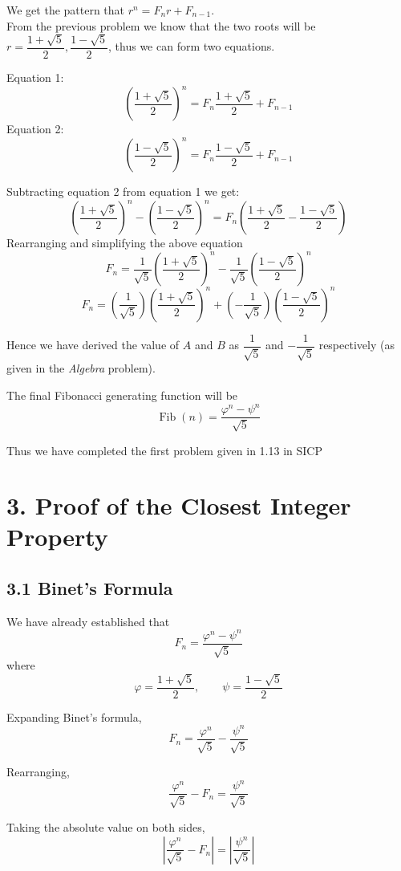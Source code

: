 \documentclass[10pt,letterpaper]{article}
\begin{document}
  We get the pattern that $r^n = F_{n}r + F_{n - 1}$.\\
  From the previous problem we know that the two roots will be
  $r = \dfrac{1 + \sqrt{5}}{2}, \dfrac{1 - \sqrt{5}}{2}$, thus we can form two equations.

  Equation 1:
  \[
  \left(\dfrac{1 + \sqrt{5}}{2}\right)^n = F_{n}\dfrac{1 + \sqrt{5}}{2} + F_{n - 1}
  \]
  Equation 2:
  \[
  \left(\dfrac{1 - \sqrt{5}}{2}\right)^n = F_{n}\dfrac{1 - \sqrt{5}}{2} + F_{n - 1}
  \]

  Subtracting equation 2 from equation 1 we get:
  \[
  \left(\dfrac{1 + \sqrt{5}}{2}\right)^n - \left(\dfrac{1 - \sqrt{5}}{2}\right)^n = F_{n}\left(\dfrac{1 + \sqrt{5}}{2} - \dfrac{1 - \sqrt{5}}{2} \right)
  \]
  Rearranging and simplifying the above equation
  \[
  F_{n} = \dfrac{1}{\sqrt5}\left(\dfrac{1 + \sqrt{5}}{2}\right)^n - \dfrac{1}{\sqrt5}\left(\dfrac{1 - \sqrt{5}}{2}\right)^n
  \]
  \[
  F_{n} = \left(\dfrac{1}{\sqrt5}\right)\left(\dfrac{1 + \sqrt{5}}{2}\right)^n + \left(-\dfrac{1}{\sqrt5}\right)\left(\dfrac{1 - \sqrt{5}}{2}\right)^n
  \]

  Hence we have derived the value of $A$ and $B$ as $\dfrac{1}{\sqrt5}$ and $-\dfrac{1}{\sqrt5}$ respectively (as given in the \textit{Algebra} problem).

  The final Fibonacci generating function will be
  \[
  \operatorname{Fib}(n) =
  \frac{\varphi^n - \psi^n}{\sqrt{5}}
  \]

  Thus we have completed the first problem given in 1.13 in SICP

\section*{3. Proof of the Closest Integer Property}

\subsection*{3.1 Binet's Formula}

We have already established that
\[
F_n = \dfrac{\varphi^n - \psi^n}{\sqrt{5}}
\]
where
\[
\varphi = \dfrac{1 + \sqrt{5}}{2},
\qquad
\psi = \dfrac{1 - \sqrt{5}}{2}
\]

Expanding Binet's formula,
\[
F_n = \dfrac{\varphi^n}{\sqrt{5}}
      - \dfrac{\psi^n}{\sqrt{5}}
\]

Rearranging,
\[
\dfrac{\varphi^n}{\sqrt{5}} - F_n
= \dfrac{\psi^n}{\sqrt{5}}
\]

Taking the absolute value on both sides,
\[
\boxed{
\left|\dfrac{\varphi^n}{\sqrt{5}} - F_n\right|
=
\left|\dfrac{\psi^n}{\sqrt{5}}\right|
}
\]
\end{document}
